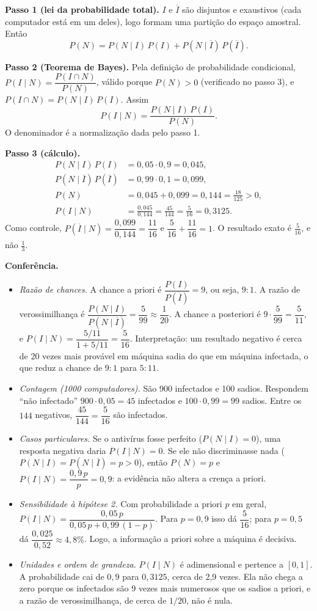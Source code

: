 \documentclass{article}%
\begin{document}
\textbf{Passo 1 (lei da probabilidade total).} $I$ e $\overline{I}$ são disjuntos e exaustivos (cada computador está em um deles), logo formam uma partição do espaço amostral. Então
\[
P(N)=P(N\mid I)\,P(I)+P(N\mid \overline{I})\,P(\overline{I}).
\]

\textbf{Passo 2 (Teorema de Bayes).} Pela definição de probabilidade condicional, $P(I\mid N)=\dfrac{P(I\cap N)}{P(N)}$, válido porque $P(N)>0$ (verificado no passo 3), e $P(I\cap N)=P(N\mid I)\,P(I)$. Assim
\[
P(I\mid N)=\frac{P(N\mid I)\,P(I)}{P(N)}.
\]
O denominador é a normalização dada pelo passo 1.

\textbf{Passo 3 (cálculo).}
\begin{align*}
P(N\mid I)\,P(I) &= 0{,}05\cdot 0{,}9 = 0{,}045,\\
P(N\mid \overline{I})\,P(\overline{I}) &= 0{,}99\cdot 0{,}1 = 0{,}099,\\
P(N) &= 0{,}045+0{,}099 = 0{,}144 = \frac{18}{125}>0,\\
P(I\mid N) &= \frac{0{,}045}{0{,}144}=\frac{45}{144}=\frac{5}{16}=0{,}3125.
\end{align*}
Como controle, $P(\overline{I}\mid N)=\dfrac{0{,}099}{0{,}144}=\dfrac{11}{16}$ e $\dfrac{5}{16}+\dfrac{11}{16}=1$. O resultado exato é $\frac{5}{16}$, e não $\frac{1}{3}$.

\textbf{Conferência.}
\begin{itemize}
\item \textit{Razão de chances.} A chance a priori é $\dfrac{P(I)}{P(\overline{I})}=9$, ou seja, $9{:}1$. A razão de verossimilhança é $\dfrac{P(N\mid I)}{P(N\mid \overline{I})}=\dfrac{5}{99}\approx\dfrac{1}{20}$. A chance a posteriori é $9\cdot\dfrac{5}{99}=\dfrac{5}{11}$, e $P(I\mid N)=\dfrac{5/11}{1+5/11}=\dfrac{5}{16}$. Interpretação: um resultado negativo é cerca de 20 vezes mais provável em máquina sadia do que em máquina infectada, o que reduz a chance de $9{:}1$ para $5{:}11$.
\item \textit{Contagem (1000 computadores).} São 900 infectados e 100 sadios. Respondem ``não infectado'' $900\cdot 0{,}05=45$ infectados e $100\cdot 0{,}99=99$ sadios. Entre os $144$ negativos, $\dfrac{45}{144}=\dfrac{5}{16}$ são infectados.
\item \textit{Casos particulares.} Se o antivírus fosse perfeito ($P(N\mid I)=0$), uma resposta negativa daria $P(I\mid N)=0$. Se ele não discriminasse nada ($P(N\mid I)=P(N\mid \overline{I})=p>0$), então $P(N)=p$ e $P(I\mid N)=\dfrac{0{,}9\,p}{p}=0{,}9$: a evidência não altera a crença a priori.
\item \textit{Sensibilidade à hipótese 2.} Com probabilidade a priori $p$ em geral, $P(I\mid N)=\dfrac{0{,}05\,p}{0{,}05\,p+0{,}99\,(1-p)}$. Para $p=0{,}9$ isso dá $\dfrac{5}{16}$; para $p=0{,}5$ dá $\dfrac{0{,}025}{0{,}52}\approx 4{,}8\%$. Logo, a informação a priori sobre a máquina é decisiva.
\item \textit{Unidades e ordem de grandeza.} $P(I\mid N)$ é adimensional e pertence a $[0,1]$. A probabilidade cai de $0{,}9$ para $0{,}3125$, cerca de 2,9 vezes. Ela não chega a zero porque os infectados são 9 vezes mais numerosos que os sadios a priori, e a razão de verossimilhança, de cerca de $1/20$, não é nula.
\end{itemize}
\end{document}
